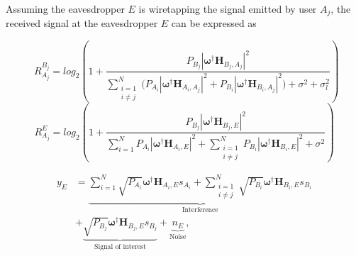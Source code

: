 \documentclass[lettersize,journal]{IEEEtran}
\begin{document}
Assuming the eavesdropper $E$ is wiretapping the signal emitted by user $A_j$, the received signal at the eavesdropper $E$ can be expressed as


\begin{figure}[!t]
\normalsize
\begin{equation}
\label{eqn_dbl_x}
R_{A_j}^{B_j} = log_2 \left(1+ \frac{P_{B_j}|\boldsymbol{\omega}^\dag \mathbf{H}_{B_j,A_j}|^2}{\sum_{\substack{i=1 \\ i\neq j}}^N { ( P_{A_i}|\boldsymbol{\omega}^\dag \mathbf{H}_{A_i,A_j}|^2} + P_{B_i}|\boldsymbol{\omega}^\dag \mathbf{H}_{B_i,A_j}|^2 ) + \sigma^2 + \sigma_{l}^2}\right)
\end{equation}
\begin{equation}
\label{eqn_dbl_y}
R_{A_j}^E = log_2 \left(1+ \frac{P_{B_j}|\boldsymbol{\omega}^\dag \mathbf{H}_{B_j,E}|^2}{\sum_{i=1}^N {P_{A_i}|\boldsymbol{\omega}^\dag \mathbf{H}_{A_i,E}|^2} + \sum_{\substack{i=1 \\ i\neq j}}^N {P_{B_i}|\boldsymbol{\omega}^\dag \mathbf{H}_{B_i,E}|^2} + \sigma^2}\right)
\end{equation}
\hrulefill
\end{figure}



\begin{equation}
\label{eqn2}
\begin{split}
 y_{E} & = \underbrace{\sum_{i=1}^{N} \sqrt{P_{A_i}} \boldsymbol{\omega^\dag} \mathbf{H}_{A_i,E}s_{A_i} + \sum_{\substack{i=1 \\ i\neq j}}^{N} \sqrt{P_{B_i}} \boldsymbol{\omega^\dag} \mathbf{H}_{B_i,E}s_{B_i}}_{\text{Interference}} \\&+ \underbrace{\sqrt{P_{B_j}} \boldsymbol{\omega^\dag} \mathbf{H}_{B_j,E}s_{B_j}}_{\text{Signal of interest}} + \underbrace{n_{E}}_{\text{Noise}} ,
\end{split}
\end{equation}
\end{document}
